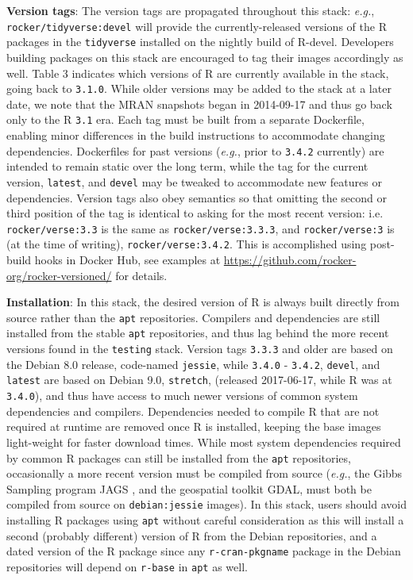\textbf{Version tags}: The version tags are propagated throughout this
stack: \emph{e.g.}, \texttt{rocker/tidyverse:devel} will provide the
currently-released versions of the R packages in the \texttt{tidyverse}
\citep{tidyverse} installed on the nightly build of R-devel. Developers
building packages on this stack are encouraged to tag their images
accordingly as well. Table 3 indicates which versions of R are currently
available in the stack, going back to \texttt{3.1.0}. While older
versions may be added to the stack at a later date, we note that the
MRAN snapshots began in 2014-09-17 and thus go back only to the R
\texttt{3.1} era. Each tag must be built from a separate Dockerfile,
enabling minor differences in the build instructions to accommodate
changing dependencies. Dockerfiles for past versions (\emph{e.g.}, prior
to \texttt{3.4.2} currently) are intended to remain static over the long
term, while the tag for the current version, \texttt{latest}, and
\texttt{devel} may be tweaked to accommodate new features or
dependencies. Version tags also obey semantics so that omitting the
second or third position of the tag is identical to asking for the most
recent version: i.e. \texttt{rocker/verse:3.3} is the same as
\texttt{rocker/verse:3.3.3}, and \texttt{rocker/verse:3} is (at the time
of writing), \texttt{rocker/verse:3.4.2}. This is accomplished using
post-build hooks in Docker Hub, see examples at
\url{https://github.com/rocker-org/rocker-versioned/} for details.

\textbf{Installation}: In this stack, the desired version of R is always
built directly from source rather than the \texttt{apt} repositories.
Compilers and dependencies are still installed from the stable
\texttt{apt} repositories, and thus lag behind the more recent versions
found in the \texttt{testing} stack. Version tags \texttt{3.3.3} and
older are based on the Debian 8.0 release, code-named \texttt{jessie},
while \texttt{3.4.0} - \texttt{3.4.2}, \texttt{devel}, and
\texttt{latest} are based on Debian 9.0, \texttt{stretch}, (released
2017-06-17, while R was at \texttt{3.4.0}), and thus have access to much
newer versions of common system dependencies and compilers. Dependencies
needed to compile R that are not required at runtime are removed once R
is installed, keeping the base images light-weight for faster download
times. While most system dependencies required by common R packages can
still be installed from the \texttt{apt} repositories, occasionally a
more recent version must be compiled from source (\emph{e.g.}, the Gibbs
Sampling program JAGS \citep{jags}, and the geospatial toolkit GDAL,
must both be compiled from source on \texttt{debian:jessie} images). In
this stack, users should avoid installing R packages using \texttt{apt}
without careful consideration as this will install a second (probably
different) version of R from the Debian repositories, and a dated
version of the R package since any \texttt{r-cran-pkgname} package in
the Debian repositories will depend on \texttt{r-base} in \texttt{apt}
as well.

